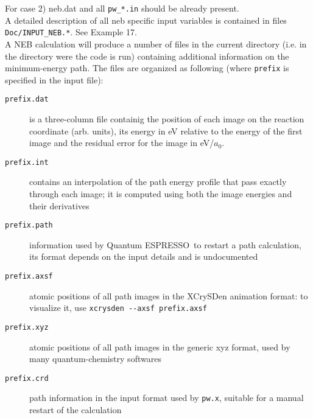 \documentclass[12pt,a4paper]{article}
\def\qe{{\sc Quantum ESPRESSO}}
\def\pw.x{\texttt{pw.x}}
\begin{document}
For case 2) neb.dat and all \texttt{pw\_*.in} should be already present. \\

A detailed description of all neb specific input
variables is contained in files \texttt{Doc/INPUT\_NEB.*}. See Example 17. \\

A NEB calculation will produce a number of files in the current directory
(i.e. in the directory were the code is run) containing additional information
on the minimum-energy path. The files are organized as following
(where \texttt{prefix} is specified in the input file):
\begin{description}
\item[\texttt{prefix.dat}]
is a three-column file containig the position of each image on the reaction
coordinate (arb. units), its energy in eV relative to the energy of the first image
and the residual error for the image in eV/$a_0$.
\item[\texttt{prefix.int}]
contains an interpolation of the path energy profile that pass exactly through each
image; it is computed using both the image energies and their derivatives
\item[\texttt{prefix.path}]
information used by \qe\ 
to restart a path calculation, its format depends on the input
details and is undocumented
\item[\texttt{prefix.axsf}]
atomic positions of all path images in the XCrySDen animation format:
to visualize it, use \texttt{xcrysden -\--axsf prefix.axsf}
\item[\texttt{prefix.xyz}]
atomic positions of all path images in the generic xyz format, used by
many quantum-chemistry softwares
\item[\texttt{prefix.crd}]
path information in the input format used by \pw.x, suitable for a manual
restart of the calculation
\end{description}
\end{document}
